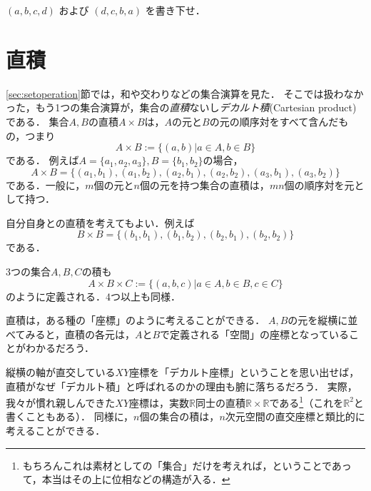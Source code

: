 \documentclass[11pt,a4paper]{jsarticle}
\begin{document}
\begin{renshu}{}{}
$(a,b,c,d)$ および $(d,c,b,a)$ を書き下せ．
\end{renshu}{}{} 

 
\section{直積}
\ref{sec:setoperation}節では，和や交わりなどの集合演算を見た．
そこでは扱わなかった，もう1つの集合演算が，集合の\emph{直積}ないし\emph{デカルト積}(Cartesian product)である．
集合$A, B$の直積$A \times B$は，$A$の元と$B$の元の順序対をすべて含んだもの，つまり
\[
 A \times B := \{ (a, b) | a \in A, b \in B\}
\]
である．
例えば$A = \{a_1, a_2, a_3\}, B = \{b_1, b_2\}$の場合，
\[
A \times B = \{(a_1, b_1), (a_1, b_2), (a_2, b_1), (a_2, b_2), (a_3, b_1), (a_3, b_2)\}
\]
である．一般に，$m$個の元と$n$個の元を持つ集合の直積は，$mn$個の順序対を元として持つ．

自分自身との直積を考えてもよい．例えば
\[
B \times B = \{(b_1, b_1), (b_1, b_2), (b_2, b_1), (b_2, b_2)\}
\]
である．

3つの集合$A, B, C$の積も
\[
 A \times B \times C := \{ (a, b, c) | a \in A, b \in B, c \in C \}
\]
のように定義される．4つ以上も同様．

直積は，ある種の「座標」のように考えることができる．
$A, B$の元を縦横に並べてみると，直積の各元は，$A$と$B$で定義される「空間」の座標となっていることがわかるだろう．
\begin{center}
\end{center}
縦横の軸が直交している$XY$座標を「デカルト座標」ということを思い出せば，直積がなぜ「デカルト積」と呼ばれるのかの理由も腑に落ちるだろう．
実際，我々が慣れ親しんできた$XY$座標は，実数$\mathbb{R}$同士の直積$\mathbb{R} \times \mathbb{R}$である\footnote{もちろんこれは素材としての「集合」だけを考えれば，ということであって，本当はその上に位相などの構造が入る．}（これを$\mathbb{R}^2$と書くこともある）．
同様に，$n$個の集合の積は，$n$次元空間の直交座標と類比的に考えることができる．
\end{document}
